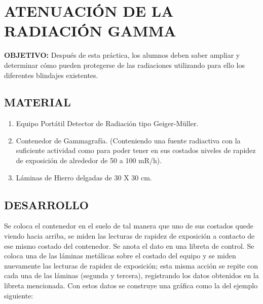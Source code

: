 
\section*{ATENUACIÓN DE LA RADIACIÓN GAMMA}

\textbf{OBJETIVO:} Después de esta práctica, los alumnos deben saber ampliar y determinar cómo pueden protegerse de las radiaciones utilizando para ello los diferentes blindajes existentes.

\subsection*{MATERIAL}
\begin{enumerate}
    \item Equipo Portátil Detector de Radiación tipo Geiger-Müller.
    \item Contenedor de Gammagrafía. (Conteniendo una fuente radiactiva con la suficiente actividad como para poder tener en sus costados niveles de rapidez de exposición de alrededor de 50 a 100 mR/h).
    \item Láminas de Hierro delgadas de 30 X 30 cm.
\end{enumerate}

\subsection*{DESARROLLO}
Se coloca el contenedor en el suelo de tal manera que uno de sus costados quede viendo hacia arriba, se miden las lecturas de rapidez de exposición a contacto de ese mismo costado del contenedor. Se anota el dato en una libreta de control. Se coloca una de las láminas metálicas sobre el costado del equipo y se miden nuevamente las lecturas de rapidez de exposición; esta misma acción se repite con cada una de las láminas (segunda y tercera), registrando los datos obtenidos en la libreta mencionada. Con estos datos se construye una gráfica como la del ejemplo siguiente: 

